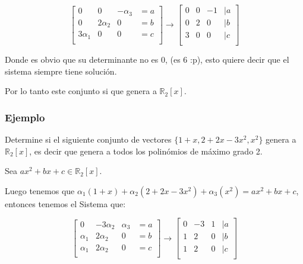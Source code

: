 \documentclass[12pt]{report}							    %
\begin{document}
            \begin{equation*}
                \begin{bmatrix}
                    0 & 0 & -\alpha_3 & = a\\
                    0 & 2\alpha_2 & 0 & = b\\
                    3\alpha_1 & 0 & 0 & = c\\
                \end{bmatrix}
                \to
                \begin{bmatrix}
                    0 & 0 & -1 & | a\\
                    0 & 2 & 0 &  | b\\
                    3 & 0 & 0 &  | c\\
                \end{bmatrix}
            \end{equation*}

            Donde es obvio que su determinante no es 0, (es 6 :p), esto quiere decir que el
            sistema siempre tiene solución.

            Por lo tanto este conjunto si que genera a $\mathbb{R}_2 [x]$.

            \subsubsection{Ejemplo}
            Determine si el siguiente conjunto de vectores $\{ 1+x,2+2x-3x^2,x^2\}$ genera
            a $\mathbb{R}_2 [x]$, es decir que genera a todos los
            polinómios de máximo grado 2.

            Sea $ax^2 + bx +c \in \mathbb{R}_2 [x]$.

            Luego tenemos que
            $\alpha_1 (1+x) + \alpha_2 (2+2x-3x^2) + \alpha_3 (x^2) = ax^2 + bx +c$,
            entonces tenemos el Sistema que:
            
            \begin{equation*}
                \begin{bmatrix}
                    0 & -3\alpha_2 & \alpha_3 & = a\\
                    \alpha_1 & 2\alpha_2 & 0 & = b\\
                    \alpha_1 & 2\alpha_2 & 0 & = c\\
                \end{bmatrix}
                \to
                \begin{bmatrix}
                    0 & -3 & 1 & | a\\
                    1 & 2 & 0 &  | b\\
                    1 & 2 & 0 &  | c\\
                \end{bmatrix}
            \end{equation*}
\end{document}
